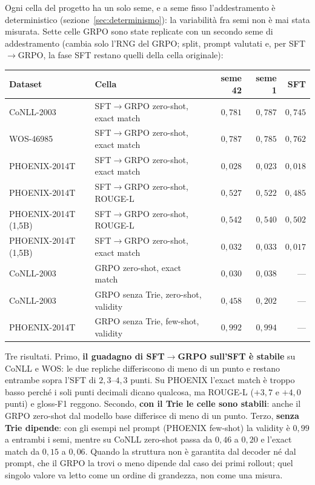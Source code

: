 Ogni cella del progetto ha un solo seme, e a seme fisso l'addestramento è
deterministico (sezione~\ref{sec:determinismo}): la variabilità fra semi non è
mai stata misurata. Sette celle GRPO sono state replicate con un secondo seme di
addestramento (cambia solo l'RNG del GRPO; split, prompt valutati e, per
SFT$\to$GRPO, la fase SFT restano quelli della cella originale):

\begin{center}
\small
\begin{tabular}{llrrr}
\toprule
Dataset & Cella & seme 42 & seme 1 & SFT \\
\midrule
CoNLL-2003    & SFT$\to$GRPO zero-shot, exact match & $0{,}781$ & $0{,}787$ & $0{,}745$ \\
WOS-46985     & SFT$\to$GRPO zero-shot, exact match & $0{,}787$ & $0{,}785$ & $0{,}762$ \\
PHOENIX-2014T & SFT$\to$GRPO zero-shot, exact match & $0{,}028$ & $0{,}023$ & $0{,}018$ \\
PHOENIX-2014T & SFT$\to$GRPO zero-shot, ROUGE-L     & $0{,}527$ & $0{,}522$ & $0{,}485$ \\
PHOENIX-2014T (1,5B) & SFT$\to$GRPO zero-shot, ROUGE-L & $0{,}542$ & $0{,}540$ & $0{,}502$ \\
PHOENIX-2014T (1,5B) & SFT$\to$GRPO zero-shot, exact match & $0{,}032$ & $0{,}033$ & $0{,}017$ \\
CoNLL-2003    & GRPO zero-shot, exact match         & $0{,}030$ & $0{,}038$ & --- \\
CoNLL-2003    & GRPO senza Trie, zero-shot, validity & $0{,}458$ & $0{,}202$ & --- \\
PHOENIX-2014T & GRPO senza Trie, few-shot, validity & $0{,}992$ & $0{,}994$ & --- \\
\bottomrule
\end{tabular}
\end{center}

Tre risultati. Primo, \textbf{il guadagno di SFT$\to$GRPO sull'SFT è stabile}
su CoNLL e WOS: le due repliche differiscono di meno di un punto e restano
entrambe sopra l'SFT di $2{,}3$--$4{,}3$ punti. Su PHOENIX l'exact match è
troppo basso perché i soli punti decimali dicano qualcosa, ma ROUGE-L ($+3{,}7$
e $+4{,}0$ punti) e gloss-F1 reggono. Secondo, \textbf{con il Trie le celle sono
stabili}: anche il GRPO zero-shot dal modello base differisce di meno di un
punto. Terzo, \textbf{senza Trie dipende}: con gli esempi nel prompt
(PHOENIX few-shot) la validity è $0{,}99$ a entrambi i semi, mentre su CoNLL
zero-shot passa da $0{,}46$ a $0{,}20$ e l'exact match da $0{,}15$ a $0{,}06.$
Quando la struttura non è garantita dal decoder né dal prompt, che il GRPO la
trovi o meno dipende dal caso dei primi rollout; quel singolo valore va letto
come un ordine di grandezza, non come una misura.


